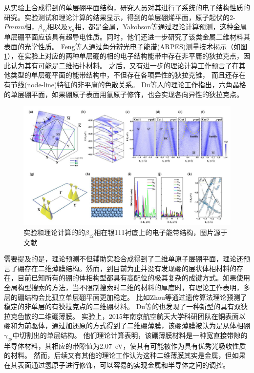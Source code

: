 从实验上合成得到的单层硼平面结构，研究人员对其进行了系统的电子结构性质的研究。实验测试和理论计算的结果显示，得到的单层硼烯平面，原子起伏的2-$Pmmn$相，$\beta_{12}$相以及$\chi_3$相，都是金属\cite{shu2016unveiling}，Yakobson等\cite{penev2016can}通过理论计算预测，这种金属单层硼平面应该具有超导电性质。同时，他们还进一步研究了该类金属二维材料其表面的光学性质\cite{huang2017two}。
Feng等\cite{feng2017dirac,feng2018discovery}人通过角分辨光电子能谱(ARPES)测量技术揭示（如图\ref{fig:ch1_boron_arpes}），在实验上对应的两种单层硼的相的电子结构能带中存在非平庸的狄拉克点，因此认为其有可能是二维拓扑材料。
之后，又有进一步的理论计算工作预言了在其他类型的单层硼平面的能带结构中，不但存在各项异性的狄拉克锥， 而且还存在有节线(node-line)特征的非平庸的色散关系\cite{zhang2017dirac}。
Du等\cite{jiao2016two}人的理论工作指出，六角晶格的单层硼平面，如果硼原子表面用氢原子修饰，也会实现各向异性的狄拉克点。

\begin{figure}[bt]
  \includegraphics[width=1.0\textwidth]{figs/ch1_boron_arpes.png}
  \centering
  \caption{实验和理论计算的的$\beta_{12}$相在银111衬底上的电子能带结构，图片源于文献\cite{feng2017dirac}}
  \label{fig:ch1_boron_arpes}
\end{figure}

需要提及的是，理论预测不但辅助实验合成得到了二维单原子层硼平面，理论还预言了硼存在二维薄膜结构。然而，到目前为止并没有发现硼的层状体相材料的存在，目前已知所有的硼的体相构型都具有高配位的极其复杂的成键方式。如果使用全局构型搜索的方法，当不限制搜索时二维的材料的厚度时，有理论工作表明，多层的硼结构会比孤立单层硼平面更加稳定。
比如Zhou等\cite{zhou2014semimetallic}通过遗传算法理论预测了稳定的非单层的有狄拉克点的二维硼材料。
Du等\cite{ma2016graphene}的也发现了一种新型的具有双狄拉克色散的二维硼薄膜。
实验上，2015年南京航空航天大学科研团队在铜表面以硼和为前驱体，通过加还原的方式得到了二维硼薄膜\cite{tai2015synthesis}，该硼薄膜被认为是从体相硼$\gamma_{28}$中切割出的单层结构。
他们理论计算表明，该硼薄膜材料是一种宽直接带隙的半导体材料，其相应的带隙值为\SI{2.07}{\eV}，使其有可能被作为具有优秀光吸收性质的材料。
然而，后续又有其他的理论工作\cite{kou2016high}认为这种二维薄膜其实是金属，但如果在其表面通过氢原子进行修饰，可以容易的实现金属和半导体之间的调控。

